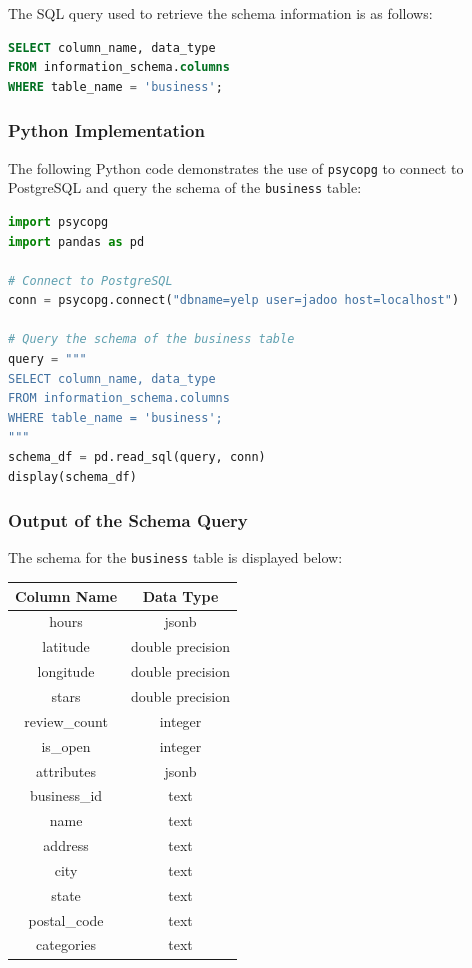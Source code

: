 \documentclass{article}
\begin{document}
The SQL query used to retrieve the schema information is as follows:

\begin{lstlisting}[language=SQL, basicstyle=\ttfamily\small]
SELECT column_name, data_type
FROM information_schema.columns
WHERE table_name = 'business';
\end{lstlisting}

\subsubsection{Python Implementation}
The following Python code demonstrates the use of \texttt{psycopg} to connect to PostgreSQL and query the schema of the \texttt{business} table:

\begin{lstlisting}[language=Python, basicstyle=\ttfamily\small, breaklines=true]
import psycopg
import pandas as pd

# Connect to PostgreSQL
conn = psycopg.connect("dbname=yelp user=jadoo host=localhost")

# Query the schema of the business table
query = """
SELECT column_name, data_type
FROM information_schema.columns
WHERE table_name = 'business';
"""
schema_df = pd.read_sql(query, conn)
display(schema_df)
\end{lstlisting}

\subsubsection{Output of the Schema Query}
The schema for the \texttt{business} table is displayed below:

\begin{center}
\begin{tabular}{|c|c|}
\hline
\textbf{Column Name} & \textbf{Data Type} \\
\hline
hours & jsonb \\
latitude & double precision \\
longitude & double precision \\
stars & double precision \\
review\_count & integer \\
is\_open & integer \\
attributes & jsonb \\
business\_id & text \\
name & text \\
address & text \\
city & text \\
state & text \\
postal\_code & text \\
categories & text \\
\hline
\end{tabular}
\end{center}
\end{document}

